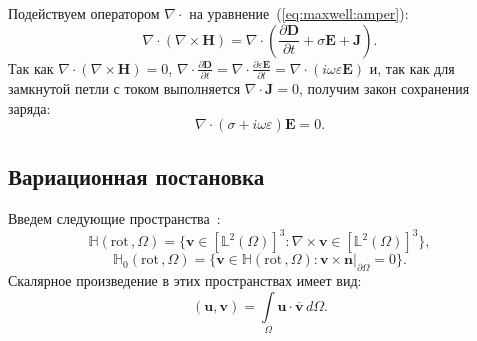\documentclass[a4paper,14pt]{article}
\begin{document}
Подействуем оператором $\nabla \cdot$ на уравнение~(\ref{eq:maxwell:amper}):
\begin{equation*}
	\nabla \cdot ( \nabla \times \mathbf{H} ) = \nabla \cdot ( \frac{\partial \mathbf{D}}{\partial t} + \sigma \mathbf{E} + \mathbf{J} ) .
\end{equation*}
Так как $\nabla \cdot ( \nabla \times \mathbf{H} ) = 0$, $\nabla \cdot \frac{\partial \mathbf{D}}{\partial t} = \nabla \cdot \frac{\partial \varepsilon \mathbf{E}}{\partial t} = \nabla \cdot (i \omega \varepsilon \mathbf{E})$ и, так как для замкнутой петли с током выполняется $\nabla \cdot \mathbf{J} = 0$, получим закон сохранения заряда:
\begin{equation}
	\nabla \cdot ( \sigma + i \omega \varepsilon ) \mathbf{E} = 0 . \label{eq:charge}
\end{equation}


\subsection{Вариационная постановка}
Введем следующие пространства~\citep{balandin_vfem,monk}:
\begin{equation*}
	\mathbb{H} ( \mathrm{rot}\,, \Omega ) = \lbrace \mathbf{v} \in [\mathbb{L}^{2}(\Omega)]^{3} : \nabla \times \mathbf{v} \in [\mathbb{L}^{2}(\Omega)]^{3} \rbrace , \label{eq:H_rot}
\end{equation*}
\begin{equation*}
	\mathbb{H}_{0}( \mathrm{rot}\,, \Omega ) = \lbrace \mathbf{v} \in \mathbb{H}(\mathrm{rot}\,, \Omega) : \left. \mathbf{v} \times \mathbf{n} \right|_{\partial \Omega} = 0  \rbrace . \label{eq:H0_rot}
\end{equation*}
Скалярное произведение в этих пространствах имеет вид:
\begin{equation*}
	( \mathbf{u}, \mathbf{v} ) = \int\limits_{\Omega} \mathbf{u} \cdot \overline{\mathbf{v}} \,d\Omega .
\end{equation*}
\end{document}
